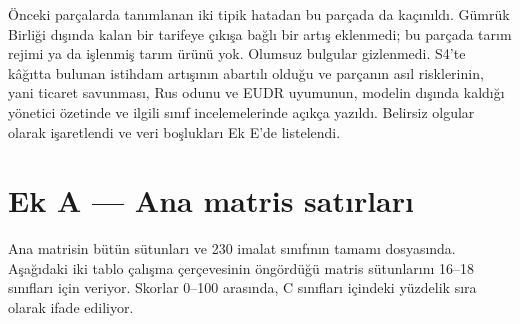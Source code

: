 Önceki parçalarda tanımlanan iki tipik hatadan bu parçada da kaçınıldı. Gümrük Birliği dışında kalan bir tarifeye çıkışa bağlı bir artış eklenmedi; bu parçada tarım rejimi ya da işlenmiş tarım ürünü yok. Olumsuz bulgular gizlenmedi. S4'te kâğıtta bulunan istihdam artışının abartılı olduğu ve parçanın asıl risklerinin, yani ticaret savunması, Rus odunu ve EUDR uyumunun, modelin dışında kaldığı yönetici özetinde ve ilgili sınıf incelemelerinde açıkça yazıldı. Belirsiz olgular \etiketD{} olarak işaretlendi ve veri boşlukları Ek E'de listelendi.

\hypertarget{nace_kartlar_16-18-ek-a--ana-matris-satux131rlarux131}{%
\section{Ek A --- Ana matris satırları}\label{nace_kartlar_16-18-ek-a--ana-matris-satux131rlarux131}}

Ana matrisin bütün sütunları ve 230 imalat sınıfının tamamı  dosyasında. Aşağıdaki iki tablo çalışma çerçevesinin öngördüğü matris sütunlarını 16--18 sınıfları için veriyor. Skorlar 0--100 arasında, C sınıfları içindeki yüzdelik sıra olarak ifade ediliyor.

